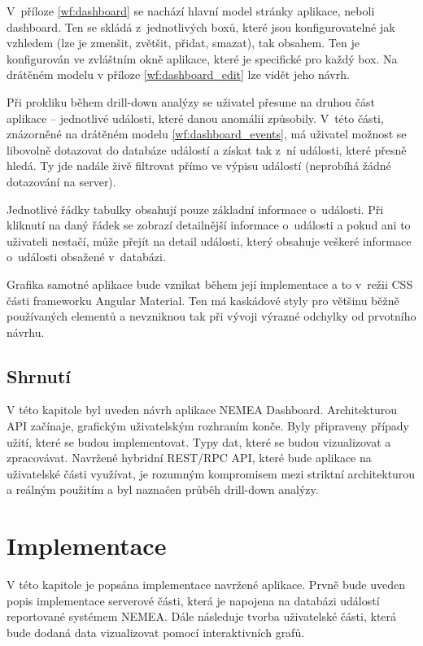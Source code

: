 V~příloze \ref{wf:dashboard} se nachází hlavní model stránky aplikace, neboli dashboard. Ten se skládá z~jednotlivých boxů, které jsou konfigurovatelné jak vzhledem (lze je zmenšit, zvětšit, přidat, smazat), tak obsahem. Ten je konfigurován ve zvláštním okně aplikace, které je specifické pro každý box. Na drátěném modelu v příloze \ref{wf:dashboard_edit} lze vidět jeho návrh.

Při prokliku během drill-down analýzy se uživatel přesune na druhou část aplikace -- jednotlivé události, které danou anomálii způsobily. V~této části, znázorněné na drátěném modelu \ref{wf:dashboard_events}, má uživatel možnost se libovolně dotazovat do databáze událostí a získat tak z~ní události, které přesně hledá. Ty jde nadále živě filtrovat přímo ve výpisu událostí (neprobíhá žádné dotazování na server).

Jednotlivé řádky tabulky obsahují pouze základní informace o~události. Při kliknutí na daný řádek se zobrazí detailnější informace o~události a pokud ani to uživateli nestačí, může přejít na detail události, který obsahuje veškeré informace o~události obsažené v~databázi.

Grafika samotné aplikace bude vznikat během její implementace a to v~režii CSS části frameworku Angular Material. Ten má kaskádové styly pro většinu běžně používaných elementů a nevzniknou tak při vývoji výrazné odchylky od prvotního návrhu.

\section{Shrnutí}

V této kapitole byl uveden návrh aplikace NEMEA Dashboard. Architekturou API začínaje, grafickým uživatelským rozhraním konče. Byly připraveny případy užití, které se budou implementovat. Typy dat, které se budou vizualizovat a zpracovávat. Navržené hybridní REST/RPC API, které bude aplikace na uživatelské části využívat, je rozumným kompromisem mezi striktní architekturou a reálným použitím a byl naznačen průběh drill-down analýzy.

\chapter{Implementace}
\label{implementace}

V této kapitole je popsána implementace navržené aplikace. Prvně bude uveden popis implementace serverové části, která je napojena na databázi událostí reportované systémem NEMEA. Dále následuje tvorba uživatelské části, která bude dodaná data vizualizovat pomocí interaktivních grafů.

